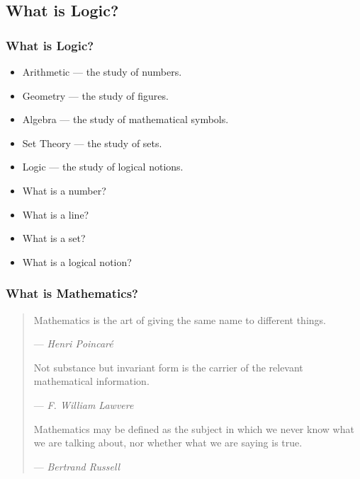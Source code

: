 \documentclass[UTF8,aspectratio=43,11pt,colorlinks,compress,openany]{beamer}%
\begin{document}
\subsection{What is Logic?}

\begin{frame}\frametitle{What is Logic?}
	\begin{itemize}
		\item Arithmetic --- the study of numbers.
		\item Geometry --- the study of figures.
		\item Algebra --- the study of mathematical symbols.
		\item Set Theory --- the study of sets.
		\item Logic --- the study of logical notions.
	\end{itemize}
	\begin{itemize}
		\item What is a number?
		\item What is a line?
		\item What is a set?
		\item What is a logical notion?
	\end{itemize}
\end{frame}

\begin{frame}\frametitle{What is Mathematics?}
	\begin{quote}
		Mathematics is the art of giving the same name to different things.\par
		\hfill --- \textsl{Henri Poincar\'e}
		
		Not substance but invariant form is the carrier of the relevant mathematical information.\par
		\hfill --- \textsl{F. William Lawvere}
		
		Mathematics may be defined as the subject in which we never know what we are talking about, nor whether what we are saying is true.\par
		\hfill --- \textsl{Bertrand Russell}
	\end{quote}
\end{frame}
\end{document}
